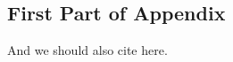 
\subsection{First Part of Appendix}
	\lipsum[1-3]

	And we should also cite \textcite{Camerer2016_evaluating_replicability} here.

	\lipsum[4]
